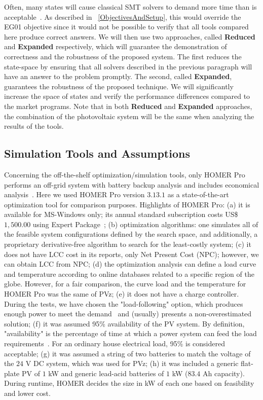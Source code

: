 \documentclass[journal]{IEEEtran}
\begin{document}
Often, many states will cause classical SMT solvers to demand more time than is acceptable~\cite{abs-1909-13139}. As described in ~\ref{ObjectivesAndSetup}, this would override the EG01 objective since it would not be possible to verify that all tools compared here produce correct answers. We will then use two approaches, called \textbf{Reduced} and \textbf{Expanded} respectively, which will guarantee the demonstration of correctness and the robustness of the proposed system. The first reduces the state-space by ensuring that all solvers described in the previous paragraph will have an answer to the problem promptly. The second, called \textbf{Expanded}, guarantees the robustness of the proposed technique. We will significantly increase the space of states and verify the performance differences compared to the market programs. Note that in both \textbf{Reduced} and \textbf{Expanded} approaches, the combination of the photovoltaic system will be the same when analyzing the results of the tools.

\subsection{Simulation Tools and Assumptions}
\label{sec:SimulationToolsandAssumptions}

Concerning the off-the-shelf optimization/simulation tools, only HOMER Pro performs an off-grid system with battery backup analysis and includes economical analysis~\cite{Pradhan,Swarnkar}. Here we used HOMER Pro version $3.13.1$ as a state-of-the-art optimization tool for comparison purposes. Highlights of HOMER Pro:
%
(a) it is available for MS-Windows only; its annual standard subscription costs US\$ $1,500.00$ using Expert Package~\cite{HOMER};
(b) optimization algorithms: one simulates all of the feasible system configurations defined by the search space, and additionally, a proprietary derivative-free algorithm to search for the least-costly system;
(c) it does not have LCC cost in its reports, only Net Present Cost (NPC); however, we can obtain LCC from NPC; 
(d) the optimization analysis can define a load curve and temperature according to online databases related to a specific region of the globe. However, for a fair comparison, the curve load and the temperature for HOMER Pro was the same of PVz; 
(e) it does not have a charge controller. During the tests, we have chosen the "load-following" option, which produces enough power to meet the demand~\cite{HOMER} and (usually) presents a non-overestimated solution; 
(f) it was assumed 95\% availability of the PV system. By definition, "availability" is the percentage of time at which a power system can feed the load requirements~\cite{Khatib2014}. For an ordinary house electrical load, 95\% is considered acceptable;
(g) it was assumed a string of two batteries to match the voltage of the $24$ V DC system, which was used for PVz; 
(h) it was included a generic flat-plate PV of $1$ kW and generic lead-acid batteries of $1$ kW ($83.4$ Ah capacity). During runtime, HOMER decides the size in kW of each one based on feasibility and lower cost.
\end{document}
